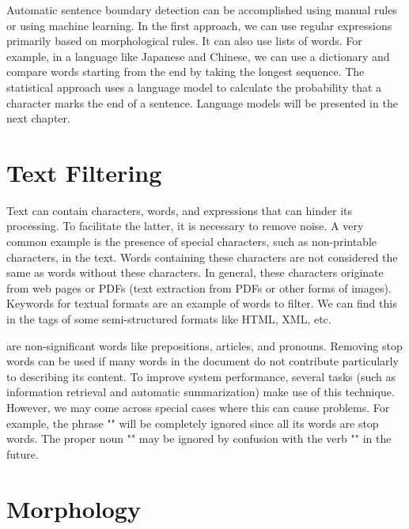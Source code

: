 \documentclass{KBook}
\begin{document}
Automatic sentence boundary detection can be accomplished using manual rules or using machine learning. 
In the first approach, we can use regular expressions primarily based on morphological rules.
It can also use lists of words. 
For example, in a  language like Japanese and Chinese, we can use a dictionary and compare words starting from the end by taking the longest sequence.
The statistical approach uses a language model to calculate the probability that a character marks the end of a sentence. 
Language models will be presented in the next chapter. 



\section{Text Filtering}

Text can contain characters, words, and expressions that can hinder its processing. 
To facilitate the latter, it is necessary to remove noise. 
A very common example is the presence of special characters, such as non-printable characters, in the text. 
Words containing these characters are not considered the same as words without these characters. 
In general, these characters originate from web pages or PDFs (text extraction from PDFs or other forms of images).
Keywords for textual formats are an example of words to filter. 
We can find this in the tags of some semi-structured formats like HTML, XML, etc.


 are non-significant words like prepositions, articles, and pronouns.
Removing stop words can be used if many words in the document do not contribute particularly to describing its content.
To improve system performance, several tasks (such as information retrieval and automatic summarization) make use of this technique.
However, we may come across special cases where this can cause problems. 
For example, the phrase "" will be completely ignored since all its words are stop words.
The proper noun "" may be ignored by confusion with the verb "" in the future.


\section{Morphology}
\end{document}
